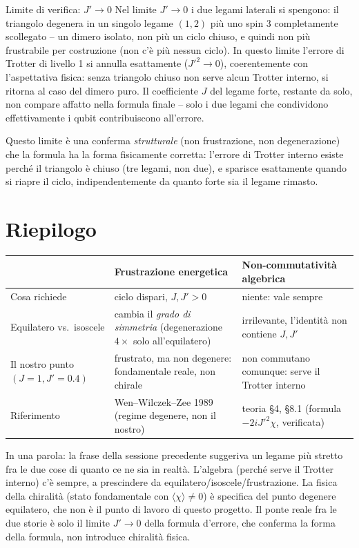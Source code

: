 \documentclass[11pt,a4paper]{article}
\begin{document}
\begin{okbox}{Limite di verifica: $J'\to0$}
Nel limite $J'\to0$ i due legami laterali si spengono: il triangolo
degenera in un singolo legame $(1,2)$ più uno spin 3 completamente
scollegato -- un dimero isolato, non più un ciclo chiuso, e quindi non
più frustrabile per costruzione (non c'è più nessun ciclo). In questo
limite l'errore di Trotter di livello 1 si annulla esattamente
($J'^2\to0$), coerentemente con l'aspettativa fisica: senza triangolo
chiuso non serve alcun Trotter interno, si ritorna al caso del dimero
puro. Il coefficiente $J$ del legame forte, restante da solo, non compare
affatto nella formula finale -- solo i due legami che condividono
effettivamente i qubit contribuiscono all'errore.
\end{okbox}

Questo limite è una conferma \emph{strutturale} (non frustrazione, non
degenerazione) che la formula ha la forma fisicamente corretta: l'errore
di Trotter interno esiste perché il triangolo è chiuso (tre legami, non
due), e sparisce esattamente quando si riapre il ciclo, indipendentemente
da quanto forte sia il legame rimasto.

\section{Riepilogo}

\begin{center}
\renewcommand{\arraystretch}{1.35}
\begin{tabular}{@{}p{4.6cm}p{5.1cm}p{5.1cm}@{}}
\toprule
& \textbf{Frustrazione energetica} & \textbf{Non-commutatività algebrica} \\
\midrule
Cosa richiede & ciclo dispari, $J,J'>0$ & niente: vale sempre \\
Equilatero vs.\ isoscele & cambia il \emph{grado di simmetria} (degenerazione $4\times$ solo all'equilatero) & irrilevante, l'identità non contiene $J,J'$ \\
Il nostro punto $(J{=}1,J'{=}0.4)$ & frustrato, ma non degenere: fondamentale reale, non chirale & non commutano comunque: serve il Trotter interno \\
Riferimento & Wen--Wilczek--Zee 1989 (regime degenere, non il nostro) & teoria \S4, \S8.1 (formula $-2iJ'^2\chi$, verificata) \\
\bottomrule
\end{tabular}
\end{center}

\begin{editnote}
In una parola: la frase della sessione precedente suggeriva un legame più
stretto fra le due cose di quanto ce ne sia in realtà. L'algebra
(perché serve il Trotter interno) c'è sempre, a prescindere da
equilatero/isoscele/frustrazione. La fisica della chiralità (stato
fondamentale con $\langle\chi\rangle\neq0$) è specifica del punto
degenere equilatero, che non è il punto di lavoro di questo progetto. Il
ponte reale fra le due storie è solo il limite $J'\to0$ della formula
d'errore, che conferma la forma della formula, non introduce chiralità
fisica.
\end{editnote}
\end{document}
